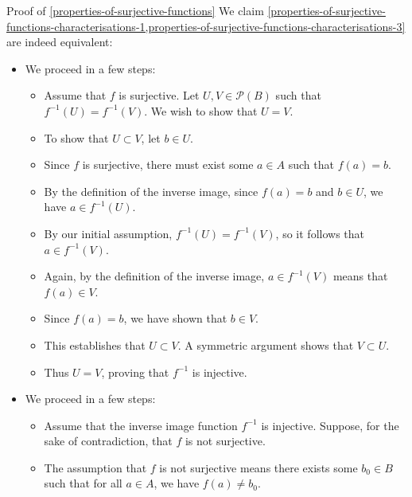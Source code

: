 \begin{Proof}{Proof of \cref{properties-of-surjective-functions}}
    We claim \cref{properties-of-surjective-functions-characterisations-1,properties-of-surjective-functions-characterisations-3} are indeed equivalent:
    \begin{itemize}
        \item{}We proceed in a few steps:
            \begin{itemize}
                \item Assume that $f$ is surjective. Let $U,V\in\mathcal{P}(B)$ such that $f^{-1}(U)=f^{-1}(V)$. We wish to show that $U=V$.
                \item To show that $U\subset V$, let $b\in U$.
                \item Since $f$ is surjective, there must exist some $a\in A$ such that $f(a)=b$.
                \item By the definition of the inverse image, since $f(a)=b$ and $b\in U$, we have $a\in f^{-1}(U)$.
                \item By our initial assumption, $f^{-1}(U)=f^{-1}(V)$, so it follows that $a\in f^{-1}(V)$.
                \item Again, by the definition of the inverse image, $a\in f^{-1}(V)$ means that $f(a)\in V$.
                \item Since $f(a)=b$, we have shown that $b\in V$.
                \item This establishes that $U\subset V$. A symmetric argument shows that $V\subset U$.
                \item Thus $U=V$, proving that $f^{-1}$ is injective.
            \end{itemize}
        \item{}We proceed in a few steps:
            \begin{itemize}
                \item Assume that the inverse image function $f^{-1}$ is injective. Suppose, for the sake of contradiction, that $f$ is not surjective.
                \item The assumption that $f$ is not surjective means there exists some $b_{0}\in B$ such that for all $a\in A$, we have $f(a)\neq b_{0}$.

\end{itemize}
\end{itemize}
\end{Proof}
